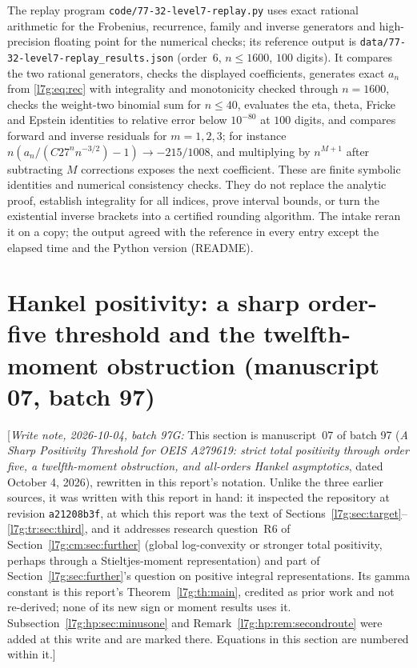 \documentclass[11pt,letterpaper]{article}
\newcommand{\file}[1]{\nolinkurl{#1}}
\theoremstyle{remark}\newtheorem{remark}[theorem]{Remark}
\newcommand{\hpnote}[1]{\textup{[}\emph{Write note, 2026-10-04, batch 97G:} #1\textup{]}}
\newcounter{l7gtrsavedeq}
\begin{document}
The replay program \file{code/77-32-level7-replay.py} uses exact rational
arithmetic for the Frobenius, recurrence, family and inverse generators and
high-precision floating point for the numerical checks; its reference output
is \file{data/77-32-level7-replay_results.json} (order~$6$, $n\le1600$,
$100$ digits). It compares the two rational generators, checks the
displayed coefficients, generates exact $a_n$ from \eqref{l7g:eq:rec} with
integrality and monotonicity checked through $n=1600$, checks the
weight-two binomial sum for $n\le40$, evaluates the eta, theta, Fricke and
Epstein identities to relative error below $10^{-80}$ at $100$ digits, and
compares forward and inverse residuals for $m=1,2,3$; for instance
$n(a_n/(C27^nn^{-3/2})-1)\to-215/1008$, and multiplying by $n^{M+1}$
after subtracting $M$ corrections exposes the next coefficient. These are
finite symbolic identities and numerical consistency checks. They do not
replace the analytic proof, establish integrality for all indices, prove
interval bounds, or turn the existential inverse brackets into a certified
rounding algorithm. The intake reran it on a copy; the output agreed with
the reference in every entry except the elapsed time and the Python
version (README).

\setcounter{equation}{\value{l7gtrsavedeq}}
\renewcommand{\theequation}{\arabic{equation}}
\renewcommand{\theHequation}{\arabic{equation}}

\section{Hankel positivity: a sharp order-five threshold and the twelfth-moment obstruction (manuscript 07, batch 97)}\label{l7g:hp:sec:hankel}
\setcounter{l7gtrsavedeq}{\value{equation}}\setcounter{equation}{0}
\renewcommand{\theequation}{\thesection.\arabic{equation}}
\renewcommand{\theHequation}{l7ghp.\arabic{equation}}

\hpnote{This section is manuscript~07 of batch 97 (\emph{A Sharp Positivity
Threshold for OEIS A279619: strict total positivity through order five, a
twelfth-moment obstruction, and all-orders Hankel asymptotics}, dated
October 4, 2026), rewritten in this report's notation. Unlike the three
earlier sources, it was written with this report in hand: it inspected the
repository at revision \texttt{a21208b3f}, at which this report was the
text of Sections~\ref{l7g:sec:target}--\ref{l7g:tr:sec:third}, and it
addresses research question~R6 of Section~\ref{l7g:cm:sec:further} (global
log-convexity or stronger total positivity, perhaps through a
Stieltjes-moment representation) and part of
Section~\ref{l7g:sec:further}'s question on positive integral
representations. Its gamma constant is this report's
Theorem~\ref{l7g:th:main}, credited as prior work and not re-derived; none
of its new sign or moment results uses it. Subsection~\ref{l7g:hp:sec:minusone}
and Remark~\ref{l7g:hp:rem:secondroute} were added at this write and are
marked there. Equations in this section are numbered within it.}
\end{document}
